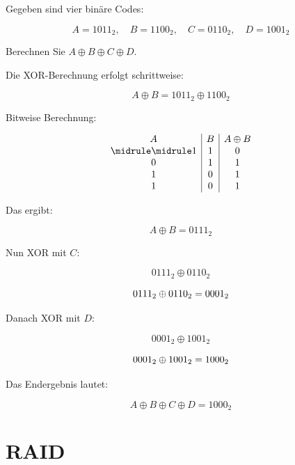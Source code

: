 \begin{myexercise}
    Gegeben sind vier binäre Codes:

    \[
        A = 1011_2, \quad B = 1100_2, \quad C = 0110_2, \quad D = 1001_2
    \]

    Berechnen Sie \( A \oplus B \oplus C \oplus D \).

    \begin{myanswer}
        Die XOR-Berechnung erfolgt schrittweise:

        \[
            A \oplus B = 1011_2 \oplus 1100_2
        \]

        Bitweise Berechnung:

        \[
            \begin{array}{c|c|c}
                A & B & A \oplus B \\\midrule\midrule
                1 & 1 & 0          \\
                0 & 1 & 1          \\
                1 & 0 & 1          \\
                1 & 0 & 1          \\
            \end{array}
        \]

        Das ergibt:

        \[
            A \oplus B = 0111_2
        \]

        Nun XOR mit \( C \):

        \[
            0111_2 \oplus 0110_2
        \]

        \[
            0111_2 \oplus 0110_2 = 0001_2 \\
        \]

        Danach XOR mit \( D \):

        \[
            0001_2 \oplus 1001_2
        \]

        \[
            0001_2 \oplus  1001_2 = 1000_2 \\
        \]

        Das Endergebnis lautet:

        \[
            A \oplus B \oplus C \oplus D = 1000_2
        \]

    \end{myanswer}
\end{myexercise}


\section{RAID}

